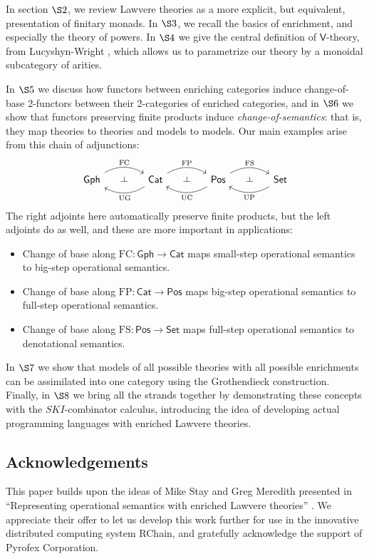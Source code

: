 \documentclass{amsart}
\theoremstyle{definition}
\def\ld{\rotatebox[origin=c]{-90}{$\dashv$}} %
\newcommand{\Gph}{\mathsf{Gph}}
\newcommand{\Set}{\mathsf{Set}}
\newcommand{\Cat}{\mathsf{Cat}}
\newcommand{\Pos}{\mathsf{Pos}}
\newcommand{\V}{\mathsf{V}}
\newcommand{\FC}{\mathrm{FC}}
\newcommand{\FP}{\mathrm{FP}}
\newcommand{\FS}{\mathrm{FS}}
\newcommand{\UC}{\mathrm{UC}}
\newcommand{\UP}{\mathrm{UP}}
\newcommand{\UG}{\mathrm{UG}}
\newcommand{\maps}{\colon}
\begin{document}
In section $\S2$, we review Lawvere theories as a more explicit, but equivalent, presentation of finitary monads. In $\S3$, we recall the basics of enrichment, and especially the theory of powers.  In $\S4$ we give the central definition of $\V$-theory, from Lucyshyn-Wright \cite{lucyshyn-wright}, which allows us to parametrize our theory by a monoidal subcategory of arities.

In $\S5$ we discuss how functors between enriching categories induce change-of-base 2-functors between their 2-categories of enriched categories, and in $\S6$ we show that functors preserving finite products induce \textit{change-of-semantics}: that is, they map theories to theories and models to models.   Our main examples arise from this chain of adjunctions:
\[\begin{tikzcd}[column sep=small]
\Gph \arrow[bend left,below]{rr}{\FC}
& \ld &
\arrow[bend left,above]{ll}{\UG} \Cat \arrow[bend left,below]{rr}{\FP}
& \ld &
\arrow[bend left,above]{ll}{\UC} \Pos \arrow[bend left,below]{rr}{\FS}
& \ld &
\Set \arrow[bend left,above]{ll}{\UP}
\end{tikzcd}\]
The right adjoints here automatically preserve finite products, but the left adjoints 
do as well, and these are more important in applications:
\begin{itemize}
\item 
Change of base along $\FC \maps \Gph \to \Cat$ maps small-step operational semantics to big-step operational semantics.
\item
Change of base along $\FP \maps \Cat \to \Pos$ maps big-step operational semantics to full-step operational semantics.
\item
Change of base along $\FS \maps \Pos \to \Set$ maps full-step operational semantics to
denotational semantics.
\end{itemize}

In $\S7$ we show that models of all possible theories with all possible enrichments can be assimilated into one category using the Grothendieck construction.  Finally, in $\S8$ we bring all the strands together by demonstrating these concepts with the $SKI$-combinator calculus, introducing the idea of developing actual programming languages with enriched Lawvere theories.

\subsection*{Acknowledgements}

This paper builds upon the ideas of Mike Stay and Greg Meredith presented in ``Representing operational semantics with enriched Lawvere theories''  \cite{roswelt}.  We appreciate their offer to let us develop this work further for use in the innovative distributed computing system RChain, and gratefully acknowledge the support of Pyrofex Corporation. 
\end{document}
